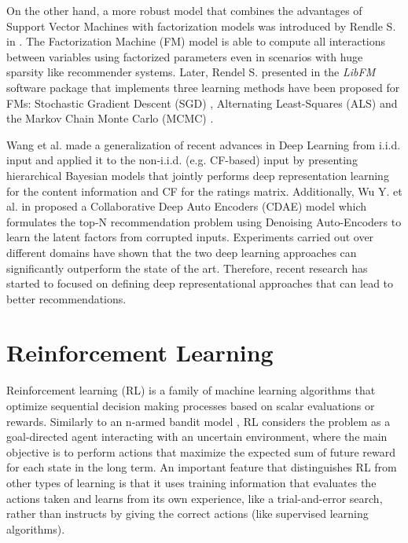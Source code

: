 On the other hand, a more robust model that combines the advantages of Support Vector Machines with factorization models was introduced by Rendle S. in \cite{rendle2010factorization}. The Factorization Machine (FM) model is able to compute all interactions between variables using factorized parameters even in scenarios with huge sparsity like recommender systems. Later, Rendel S. presented in \cite{rendle2012factorization} the \textit{LibFM} software package that implements three learning methods have been proposed for FMs: Stochastic Gradient Descent (SGD) \cite{rendle2010factorization}, Alternating Least-Squares (ALS)\cite{rendle2011fast} and the Markov Chain Monte Carlo (MCMC) \cite{freudenthaler2011bayesian}.

Wang et al. \cite{wang2015collaborative} made a generalization of recent advances in Deep Learning \cite{bengio2013representation} from i.i.d. input and applied it to the non-i.i.d. (e.g. CF-based) input by presenting hierarchical Bayesian models that jointly performs deep representation learning for the content information and CF for the ratings matrix. Additionally, Wu Y. et al. in \cite{wu2016collaborative} proposed a Collaborative Deep Auto Encoders (CDAE) model which formulates the top-N recommendation problem using Denoising Auto-Encoders to learn the latent factors from corrupted inputs. Experiments carried out over different domains have shown that the two deep learning approaches can significantly outperform the state of the art. Therefore, recent research has started to focused on defining deep representational approaches that can lead to better recommendations.

\section{Reinforcement Learning}
Reinforcement learning (RL) \cite{kaelbling1996reinforcement} is a family of machine learning algorithms that optimize sequential decision making processes based on scalar evaluations or rewards. Similarly to an n-armed bandit model \cite{katehakis1987multi}, RL considers the problem as a goal-directed agent interacting with an uncertain environment, where the main objective is to perform actions that maximize the expected sum of future reward for each state in the long term. An important feature that distinguishes RL from other types of learning is that it uses training information that evaluates the actions taken and learns from its own experience, like a trial-and-error search, rather than instructs by giving the correct actions (like supervised learning algorithms).

